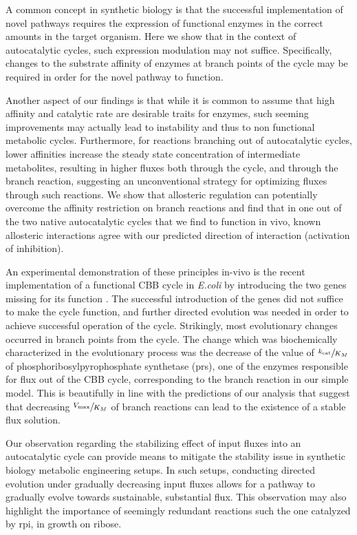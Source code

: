 A common concept in synthetic biology is that the successful implementation of novel pathways requires the expression of functional enzymes in the correct amounts in the target organism.
Here we show that in the context of autocatalytic cycles, such expression modulation may not suffice.
Specifically, changes to the substrate affinity of enzymes at branch points of the cycle may be required in order for the novel pathway to function.

Another aspect of our findings is that while it is common to assume that high affinity and catalytic rate are desirable traits for enzymes, such seeming improvements may actually lead to instability and thus to non functional metabolic cycles.
Furthermore, for reactions branching out of autocatalytic cycles, lower affinities increase the steady state concentration of intermediate metabolites, resulting in higher fluxes both through the cycle, and through the branch reaction, suggesting an unconventional strategy for optimizing fluxes through such reactions.
We show that allosteric regulation can potentially overcome the affinity restriction on branch reactions and find that in one out of the two native autocatalytic cycles that we find to function in vivo, known allosteric interactions agree with our predicted direction of interaction (activation of inhibition).

An experimental demonstration of these principles in-vivo is the recent implementation of a functional CBB cycle in \emph{E.coli} by introducing the two genes missing for its function \cite{Antonovsky2016-jy}.
The successful introduction of the genes did not suffice to make the cycle function, and further directed evolution was needed in order to achieve successful operation of the cycle.
Strikingly, most evolutionary changes occurred in branch points from the cycle.
The change which was biochemically characterized in the evolutionary process was the decrease of the value of $\sfrac{k_{\text{cat}}}{K_M}$ of phosphoribosylpyrophosphate synthetase (prs), one of the enzymes responsible for flux out of the CBB cycle, corresponding to the branch reaction in our simple model.
This is beautifully in line with the predictions of our analysis that suggest that decreasing $\sfrac{V_{\max}}{K_M}$ of branch reactions can lead to the existence of a stable flux solution.

Our observation regarding the stabilizing effect of input fluxes into an autocatalytic cycle can provide means to mitigate the stability issue in synthetic biology metabolic engineering setups.
In such setups, conducting directed evolution under gradually decreasing input fluxes allows for a pathway to gradually evolve towards sustainable, substantial flux.
This observation may also highlight the importance of seemingly redundant reactions such the one catalyzed by rpi, in growth on ribose.

